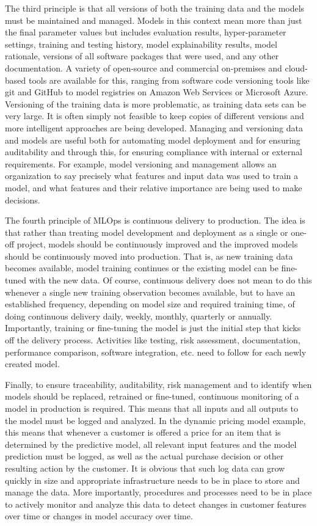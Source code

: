 The third principle is that all versions of both the training data and the models must be maintained and managed. Models in this context mean more than just the final parameter values but includes evaluation results, hyper-parameter settings, training and testing history, model explainability results, model rationale, versions of all software packages that were used, and any other documentation. A variety of open-source and commercial on-premises and cloud-based tools are available for this, ranging from software code versioning tools like git and GitHub to model registries on Amazon Web Services or Microsoft Azure. Versioning of the training data is more problematic, as training data sets can be very large. It is often simply not feasible to keep copies of different versions and more intelligent approaches are being developed. Managing and versioning data and models are useful both for automating model deployment and for ensuring auditability and through this, for ensuring compliance with internal or external requirements. For example, model versioning and management allows an organization to say precisely what features and input data was used to train a model, and what features and their relative importance are being used to make decisions. 

The fourth principle of MLOps is continuous delivery to production. The idea is that rather than treating model development and deployment as a single or one-off project, models should be continuously improved and the improved models should be continuously moved into production. That is, as new training data becomes available, model training continues or the existing model can be fine-tuned with the new data. Of course, continuous delivery does not mean to do this whenever a single new training observation becomes available, but to have an established frequency, depending on model size and required training time, of doing continuous delivery daily, weekly, monthly, quarterly or annually. Importantly, training or fine-tuning the model is just the initial step that kicks off the delivery process. Activities like testing, risk assessment, documentation, performance comparison, software integration, etc. need to follow for each newly created model.

Finally, to ensure traceability, auditability, risk management and to identify when models should be replaced, retrained or fine-tuned, continuous monitoring of a model in production is required. This means that all inputs and all outputs to the model must be logged and analyzed. In the dynamic pricing model example, this means that whenever a customer is offered a price for an item that is determined by the predictive model, all relevant input features and the model prediction must be logged, as well as the actual purchase decision or other resulting action by the customer. It is obvious that such log data can grow quickly in size and appropriate infrastructure needs to be in place to store and manage the data. More importantly, procedures and processes need to be in place to actively monitor and analyze this data to detect changes in customer features over time or changes in model accuracy over time. 

